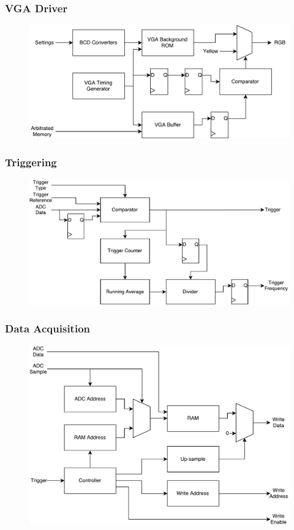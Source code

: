\documentclass[pdf]{beamer}
\begin{document}
\begin{frame}
\frametitle{VGA Driver}
\begin{figure}[!htb]
  \includegraphics[width=\linewidth]{diagrams/vga_driver.pdf}
\end{figure}
\end{frame}

\begin{frame}
\frametitle{Triggering}
\begin{figure}[!htb]
  \includegraphics[width=\linewidth]{diagrams/triggering.pdf}
\end{figure}
\end{frame}

\begin{frame}
\frametitle{Data Acquisition}
\begin{figure}[!htb]
  \includegraphics[height=0.8\textheight]{diagrams/data_acquisition.pdf}
\end{figure}
\end{frame}
\end{document}
